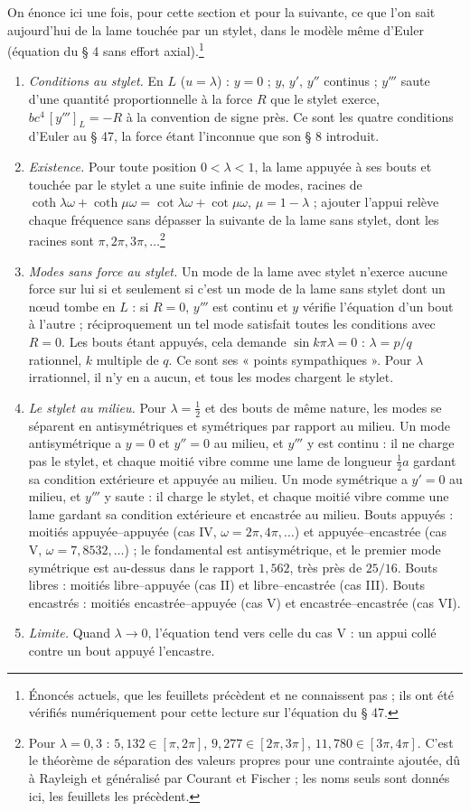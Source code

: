 \documentclass[11pt,a4paper]{article}
\begin{document}
On énonce ici une fois, pour cette section et pour la suivante, ce que l'on sait aujourd'hui de la lame touchée par un stylet, dans le modèle même d'Euler (équation du § 4 sans effort axial).\footnote{Énoncés actuels, que les feuillets précèdent et ne connaissent pas ; ils ont été vérifiés numériquement pour cette lecture sur l'équation du § 47.}
\begin{enumerate}
\item \emph{Conditions au stylet.} En $L$ ($u=\lambda$) : $y=0$ ; $y$, $y'$, $y''$ continus ; $y'''$ saute d'une quantité proportionnelle à la force $R$ que le stylet exerce, $bc^4\,[y''']_L=-R$ à la convention de signe près. Ce sont les quatre conditions d'Euler au § 47, la force étant l'inconnue que son § 8 introduit.
\item \emph{Existence.} Pour toute position $0<\lambda<1$, la lame appuyée à ses bouts et touchée par le stylet a une suite infinie de modes, racines de $\coth\lambda\omega+\coth\mu\omega=\cot\lambda\omega+\cot\mu\omega$, $\mu=1-\lambda$ ; ajouter l'appui relève chaque fréquence sans dépasser la suivante de la lame sans stylet, dont les racines sont $\pi,2\pi,3\pi,\dots$\footnote{Pour $\lambda=0{,}3$ : $5{,}132\in[\pi,2\pi]$, $9{,}277\in[2\pi,3\pi]$, $11{,}780\in[3\pi,4\pi]$. C'est le théorème de séparation des valeurs propres pour une contrainte ajoutée, dû à Rayleigh et généralisé par Courant et Fischer ; les noms seuls sont donnés ici, les feuillets les précèdent.}
\item \emph{Modes sans force au stylet.} Un mode de la lame avec stylet n'exerce aucune force sur lui si et seulement si c'est un mode de la lame sans stylet dont un nœud tombe en $L$ : si $R=0$, $y'''$ est continu et $y$ vérifie l'équation d'un bout à l'autre ; réciproquement un tel mode satisfait toutes les conditions avec $R=0$. Les bouts étant appuyés, cela demande $\sin k\pi\lambda=0$ : $\lambda=p/q$ rationnel, $k$ multiple de $q$. Ce sont ses « points sympathiques ». Pour $\lambda$ irrationnel, il n'y en a aucun, et tous les modes chargent le stylet.
\item \emph{Le stylet au milieu.} Pour $\lambda=\frac12$ et des bouts de même nature, les modes se séparent en antisymétriques et symétriques par rapport au milieu. Un mode antisymétrique a $y=0$ et $y''=0$ au milieu, et $y'''$ y est continu : il ne charge pas le stylet, et chaque moitié vibre comme une lame de longueur $\frac12a$ gardant sa condition extérieure et appuyée au milieu. Un mode symétrique a $y'=0$ au milieu, et $y'''$ y saute : il charge le stylet, et chaque moitié vibre comme une lame gardant sa condition extérieure et encastrée au milieu. Bouts appuyés : moitiés appuyée--appuyée (cas IV, $\omega=2\pi,4\pi,\dots$) et appuyée--encastrée (cas V, $\omega=7{,}8532,\dots$) ; le fondamental est antisymétrique, et le premier mode symétrique est au-dessus dans le rapport $1{,}562$, très près de $25/16$. Bouts libres : moitiés libre--appuyée (cas II) et libre--encastrée (cas III). Bouts encastrés : moitiés encastrée--appuyée (cas V) et encastrée--encastrée (cas VI).
\item \emph{Limite.} Quand $\lambda\to0$, l'équation tend vers celle du cas V : un appui collé contre un bout appuyé l'encastre.
\end{enumerate}
\end{document}
